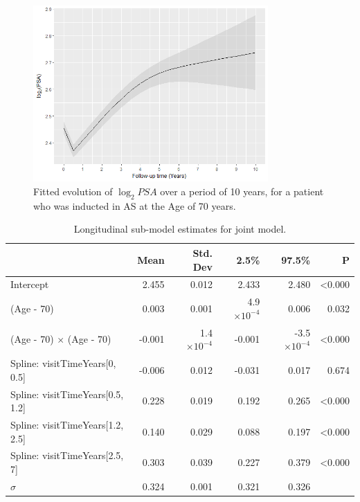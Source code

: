 \begin{figure}[!htb]
	\centering
    \captionsetup{justification=centering}
	\includegraphics[width=0.8\textwidth]{images/fitted_trend_psa.png}
	\caption{Fitted evolution of $\log_2 PSA$ over a period of 10 years, for a patient who was inducted in AS at the Age of 70 years.}
	\label{fig : fitted_trend_psa}
\end{figure}

\begin{table}[!htb]
\centering
\caption{Longitudinal sub-model estimates for joint model.}
\label{tab : PSA_long}
\captionsetup{justification=centering}
\begin{tabular}{@{}lrrrrr@{}}
\toprule
                                     & Mean   & Std. Dev           & 2.5\%               & 97.5\%              & P              \\ \midrule
Intercept                            &  2.455 & 0.012 & 2.433 & 2.480               & \textless0.000 \\
(Age - 70)                           & 0.003 & 0.001 & 4.9 $\times 10^{-4}$ & 0.006 & 0.032          \\
(Age - 70) $\times$ (Age - 70)       & -0.001 & 1.4 $\times 10^{-4}$ & -0.001 & -3.5 $\times 10^{-4}$ & \textless0.000 \\
Spline: visitTimeYears{[}0, 0.5{]}   & -0.006 & 0.012 & -0.031 & 0.017 & 0.674 \\
Spline: visitTimeYears{[}0.5, 1.2{]} & 0.228 & 0.019 & 0.192 & 0.265               & \textless0.000 \\
Spline: visitTimeYears{[}1.2, 2.5{]} & 0.140 & 0.029 & 0.088 & 0.197               & \textless0.000 \\
Spline: visitTimeYears{[}2.5, 7{]}   & 0.303 & 0.039 & 0.227 & 0.379               & \textless0.000 \\
$\sigma$                               & 0.324 & 0.001 & 0.321 & 0.326              &  \\ \bottomrule
\end{tabular}
\end{table}

